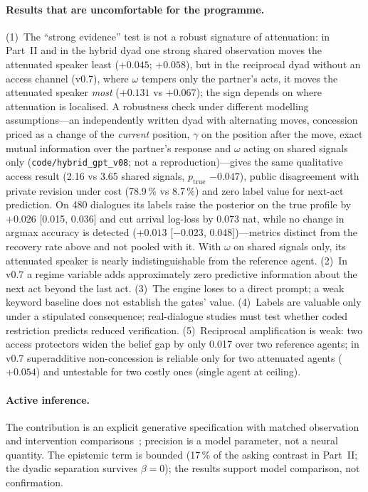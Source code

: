 \documentclass[runningheads]{llncs}
\newcommand{\Etrue}{p_{\mathrm{true}}}
\begin{document}
\paragraph{Results that are uncomfortable for the programme.} (1)~The ``strong evidence'' test is not a robust signature of attenuation: in Part~II and in the hybrid dyad one strong shared observation moves the attenuated speaker least ($+0.045$; $+0.058$), but in the reciprocal dyad without an access channel (v0.7), where $\omega$ tempers only the partner's acts, it moves the attenuated speaker \emph{most} ($+0.131$ vs $+0.067$); the sign depends on where attenuation is localised. A robustness check under different modelling assumptions---an independently written dyad with alternating moves, concession priced as a change of the \emph{current} position, $\gamma$ on the position after the move, exact mutual information over the partner's response and $\omega$ acting on shared signals only (\texttt{code/hybrid\_gpt\_v08}; not a reproduction)---gives the same qualitative access result (2.16 vs 3.65 shared signals, $\Etrue$ $-0.047$), public disagreement with private revision under cost (78.9\,\% vs 8.7\,\%) and zero label value for next-act prediction. On 480 dialogues its labels raise the posterior on the true profile by $+0.026$ [0.015, 0.036] and cut arrival log-loss by 0.073 nat, while no change in argmax accuracy is detected ($+0.013$ [$-0.023$, 0.048])---metrics distinct from the recovery rate above and not pooled with it. With $\omega$ on shared signals only, its attenuated speaker is nearly indistinguishable from the reference agent. (2)~In v0.7 a regime variable adds approximately zero predictive information about the next act beyond the last act. (3)~The engine loses to a direct prompt; a weak keyword baseline does not establish the gates' value. (4)~Labels are valuable only under a stipulated consequence; real-dialogue studies must test whether coded restriction predicts reduced verification. (5)~Reciprocal amplification is weak: two access protectors widen the belief gap by only 0.017 over two reference agents; in v0.7 superadditive non-concession is reliable only for two attenuated agents ($+0.054$) and untestable for two costly ones (single agent at ceiling).

\paragraph{Active inference.} The contribution is an explicit generative specification with matched observation and intervention comparisons~\cite{friston2017process,feldman2010attention,parr2017working}; precision is a model parameter, not a neural quantity. The epistemic term is bounded (17\,\% of the asking contrast in Part~II; the dyadic separation survives $\beta=0$); the results support model comparison, not confirmation.
\end{document}
